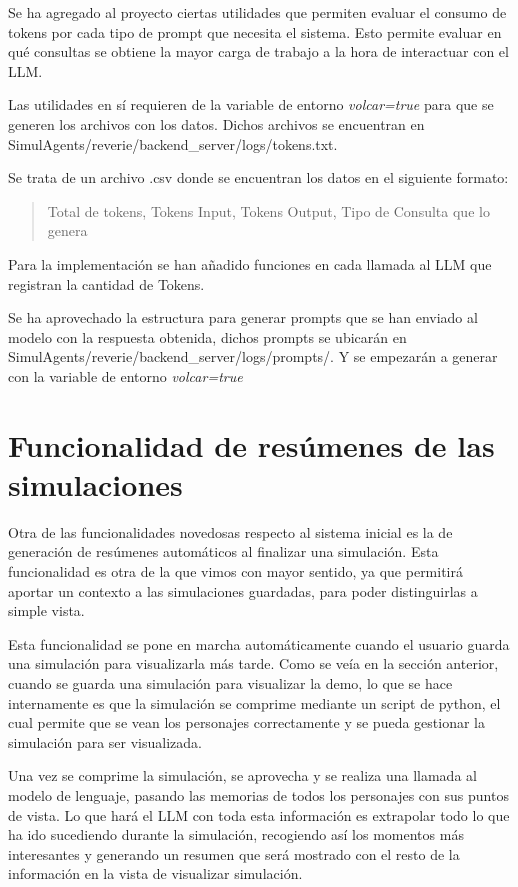 Se ha agregado al proyecto ciertas utilidades que permiten evaluar el consumo de tokens por cada tipo de prompt que necesita el sistema. Esto permite evaluar en qué consultas se obtiene la mayor carga de trabajo a la hora de interactuar con el LLM.

Las utilidades en sí requieren de la variable de entorno \textit{volcar=true} para que se generen los archivos con los datos. Dichos archivos se encuentran en SimulAgents/reverie/backend\_server/logs/tokens.txt.

Se trata de un archivo .csv donde se encuentran los datos en el siguiente formato:
\begin{quote}
    Total de tokens, Tokens Input, Tokens Output, Tipo de Consulta que lo genera
\end{quote}

Para la implementación se han añadido funciones en cada llamada al LLM que registran la cantidad de Tokens.

Se ha aprovechado la estructura para generar prompts que se han enviado al modelo con la respuesta obtenida, dichos prompts se ubicarán en SimulAgents/reverie/backend\_server/logs/prompts/. Y se empezarán a generar con la variable de entorno \textit{volcar=true}

\section{Funcionalidad de resúmenes de las simulaciones}
\label{sect:Funcionalidad de resúmenes de las simulaciones}

Otra de las funcionalidades novedosas respecto al sistema inicial es la de generación de resúmenes automáticos al finalizar una simulación. Esta funcionalidad es otra de la que vimos con mayor sentido, ya que permitirá aportar un contexto a las simulaciones guardadas, para poder distinguirlas a simple vista.

Esta funcionalidad se pone en marcha automáticamente cuando el usuario guarda una simulación para visualizarla más tarde. Como se veía en la sección anterior, cuando se guarda una simulación para visualizar la demo, lo que se hace internamente es que la simulación se comprime mediante un script de python, el cual permite que se vean los personajes correctamente y se pueda gestionar la simulación para ser visualizada.

Una vez se comprime la simulación, se aprovecha y se realiza una llamada al modelo de lenguaje, pasando las memorias de todos los personajes con sus puntos de vista. Lo que hará el LLM con toda esta información es extrapolar todo lo que ha ido sucediendo durante la simulación, recogiendo así los momentos más interesantes y generando un resumen que será mostrado con el resto de la información en la vista de visualizar simulación.

